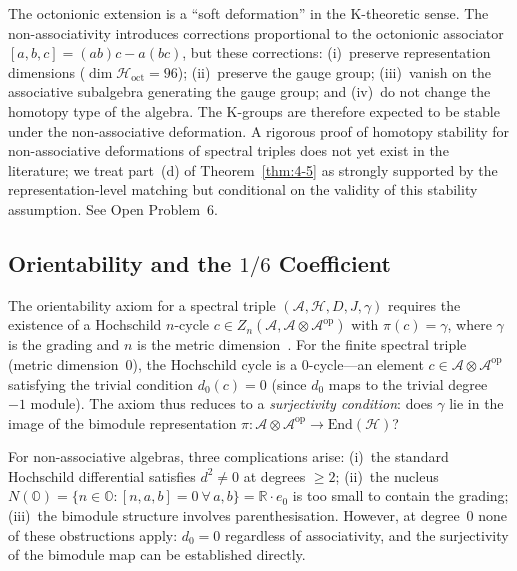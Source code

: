 \begin{remark}
The octonionic extension is a ``soft deformation'' in the K-theoretic sense. The non-associativity introduces corrections proportional to the octonionic associator $[a, b, c] = (ab)c - a(bc)$, but these corrections: (i)~preserve representation dimensions ($\dim \mathcal{H}_{\mathrm{oct}} = 96$); (ii)~preserve the gauge group; (iii)~vanish on the associative subalgebra generating the gauge group; and (iv)~do not change the homotopy type of the algebra. The K-groups are therefore expected to be stable under the non-associative deformation. A rigorous proof of homotopy stability for non-associative deformations of spectral triples does not yet exist in the literature; we treat part~(d) of Theorem~\ref{thm:4-5} as strongly supported by the representation-level matching but conditional on the validity of this stability assumption. See Open Problem~6.
\end{remark}


\subsection{Orientability and the \texorpdfstring{$1/6$}{1/6} Coefficient}
\label{sec:4-orientability-oct}

The orientability axiom for a spectral triple $(\mathcal{A}, \mathcal{H}, D, J, \gamma)$ requires the existence of a Hochschild $n$-cycle $c \in Z_n(\mathcal{A}, \mathcal{A} \otimes \mathcal{A}^{\mathrm{op}})$ with $\pi(c) = \gamma$, where $\gamma$ is the grading and $n$ is the metric dimension~\cite{ch4:Connes1994}. For the finite spectral triple (metric dimension~0), the Hochschild cycle is a 0-cycle---an element $c \in \mathcal{A} \otimes \mathcal{A}^{\mathrm{op}}$ satisfying the trivial condition $d_0(c) = 0$ (since $d_0$ maps to the trivial degree~$-1$ module). The axiom thus reduces to a \emph{surjectivity condition}: does $\gamma$ lie in the image of the bimodule representation $\pi\colon \mathcal{A} \otimes \mathcal{A}^{\mathrm{op}} \to \mathrm{End}(\mathcal{H})$?

For non-associative algebras, three complications arise: (i)~the standard Hochschild differential satisfies $d^2 \neq 0$ at degrees $\geq 2$; (ii)~the nucleus $N(\mathbb{O}) = \{n \in \mathbb{O} : [n, a, b] = 0\ \forall\, a, b\} = \mathbb{R} \cdot e_0$ is too small to contain the grading; (iii)~the bimodule structure involves parenthesisation. However, at degree~0 none of these obstructions apply: $d_0 = 0$ regardless of associativity, and the surjectivity of the bimodule map can be established directly.

